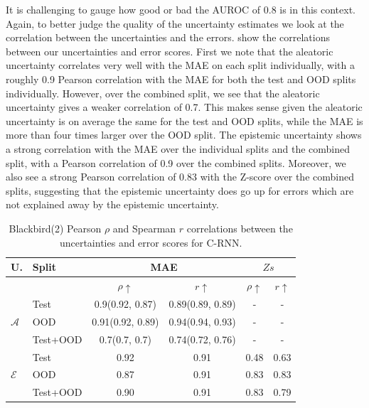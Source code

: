 It is challenging to gauge how good or bad the AUROC of 0.8 is in this context. Again, to better judge the quality of the uncertainty estimates we look at the correlation between the uncertainties and the errors.  show the correlations between our uncertainties and error scores. First we note that the aleatoric uncertainty correlates very well with the MAE on each split individually, with a roughly 0.9 Pearson correlation with the MAE for both the test and OOD splits individually. However, over the combined split, we see that the aleatoric uncertainty gives a weaker correlation of 0.7. This makes sense given the aleatoric uncertainty is on average the same for the test and OOD splits, while the MAE is more than four times larger over the OOD split. The epistemic uncertainty shows a strong correlation with the MAE over the individual splits and the combined split, with a Pearson correlation of 0.9 over the combined splits. Moreover, we also see a strong Pearson correlation of 0.83 with the Z-score over the combined splits, suggesting that the epistemic uncertainty does go up for errors which are not explained away by the epistemic uncertainty. 


\begin{table}[h]
\centering
    \begin{tabular}{l l c c c c}  
        \toprule
        U. & Split & \multicolumn{2}{c}{MAE} & \multicolumn{2}{c}{$Zs$}\\
        \midrule
        & & $\rho \uparrow$ & $r \uparrow$ & $\rho \uparrow$ & $r \uparrow$ \\
        \multirow{3}{*}{$\mathcal{A}$} 
            & Test     & 0.9(0.92, 0.87) & 0.89(0.89, 0.89) & - & - \\  
            & OOD      & 0.91(0.92, 0.89) & 0.94(0.94, 0.93) & - & - \\  
            & Test+OOD & 0.7(0.7, 0.7) & 0.74(0.72, 0.76) & - & - \\ 

        \midrule
        \multirow{3}{*}{$\mathcal{E}$} 
            & Test     & 0.92  & 0.91 &  0.48  & 0.63 \\  
            & OOD      & 0.87 & 0.91 &  0.83 & 0.83 \\
            & Test+OOD & 0.90 & 0.91 &  0.83 & 0.79 \\ 

        \toprule
    \end{tabular}
    \caption{Blackbird(2) Pearson $\rho$ and Spearman $r$ correlations between the uncertainties and error scores for C-RNN.}
    \label{tbl:bb2_corr}
\end{table}


